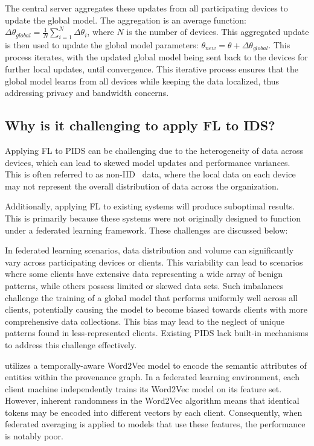 The central server aggregates these updates from all participating devices to update the global model. The aggregation is an average function: \(\Delta \theta_{global} = \frac{1}{N} \sum_{i=1}^{N} \Delta \theta_i\), where \(N\) is the number of devices. This aggregated update is then used to update the global model parameters: \(\theta_{new} = \theta + \Delta \theta_{global}\). This process iterates, with the updated global model being sent back to the devices for further local updates, until convergence. This iterative process ensures that the global model learns from all devices while keeping the data localized, thus addressing privacy and bandwidth concerns.


\subsection{Why is it challenging to apply FL to IDS?}

Applying FL to PIDS can be challenging due to the heterogeneity of data across devices, which can lead to skewed model updates and performance variances. This is often referred to as non-IID~\cite{zhao2018federated} data, where the local data on each device may not represent the overall distribution of data across the organization.

Additionally, applying FL to existing systems will produce suboptimal results. This is primarily because these systems were not originally designed to function under a federated learning framework. These challenges are discussed below:

 In federated learning scenarios, data distribution and volume can significantly vary across participating devices or clients. This variability can lead to scenarios where some clients have extensive data representing a wide array of benign patterns, while others possess limited or skewed data sets. Such imbalances challenge the training of a global model that performs uniformly well across all clients, potentially causing the model to become biased towards clients with more comprehensive data collections. This bias may lead to the neglect of unique patterns found in less-represented clients. Existing PIDS lack built-in mechanisms to address this challenge effectively.

 \flash utilizes a temporally-aware Word2Vec model to encode the semantic attributes of entities within the provenance graph. In a federated learning environment, each client machine independently trains its Word2Vec model on its feature set. However, inherent randomness in the Word2Vec algorithm means that identical tokens may be encoded into different vectors by each client. Consequently, when federated averaging is applied to \gnn models that use these features, the performance is notably poor.

